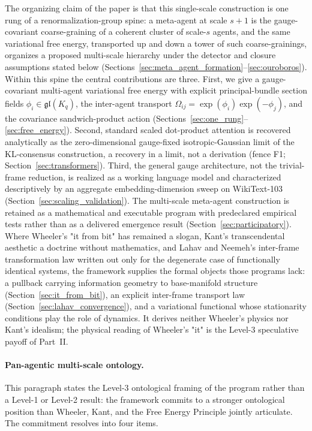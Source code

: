 \documentclass[11pt]{article}
\begin{document}
The organizing claim of the paper is that this single-scale construction is one rung of a renormalization-group spine: a meta-agent at scale $s+1$ is the gauge-covariant coarse-graining of a coherent cluster of scale-$s$ agents, and the same variational free energy, transported up and down a tower of such coarse-grainings, organizes a proposed multi-scale hierarchy under the detector and closure assumptions stated below (Sections~\ref{sec:meta_agent_formation}--\ref{sec:ouroboros}). Within this spine the central contributions are three. First, we give a gauge-covariant multi-agent variational free energy with explicit principal-bundle section fields $\phi_i \in \mathfrak{gl}(K_q)$, the inter-agent transport $\Omega_{ij} = \exp(\phi_i)\exp(-\phi_j)$, and the covariance sandwich-product action (Sections~\ref{sec:one_rung}--\ref{sec:free_energy}). Second, standard scaled dot-product attention is recovered analytically as the zero-dimensional gauge-fixed isotropic-Gaussian limit of the KL-consensus construction, a recovery in a limit, not a derivation (fence F1; Section~\ref{sec:transformers}). Third, the general gauge architecture, not the trivial-frame reduction, is realized as a working language model and characterized descriptively by an aggregate embedding-dimension sweep on WikiText-103 (Section~\ref{sec:scaling_validation}). The multi-scale meta-agent construction is retained as a mathematical and executable program with predeclared empirical tests rather than as a delivered emergence result (Section~\ref{sec:participatory}). Where Wheeler's "it from bit" has remained a slogan, Kant's transcendental aesthetic a doctrine without mathematics, and Lahav and Neemeh's inter-frame transformation law written out only for the degenerate case of functionally identical systems, the framework supplies the formal objects those programs lack: a pullback carrying information geometry to base-manifold structure (Section~\ref{sec:it_from_bit}), an explicit inter-frame transport law (Section~\ref{sec:lahav_convergence}), and a variational functional whose stationarity conditions play the role of dynamics. It derives neither Wheeler's physics nor Kant's idealism; the physical reading of Wheeler's "it" is the Level-3 speculative payoff of Part~II.

\paragraph{Pan-agentic multi-scale ontology.} This paragraph states the Level-3 ontological framing of the program rather than a Level-1 or Level-2 result: the framework commits to a stronger ontological position than Wheeler, Kant, and the Free Energy Principle jointly articulate. The commitment resolves into four items.
\end{document}
